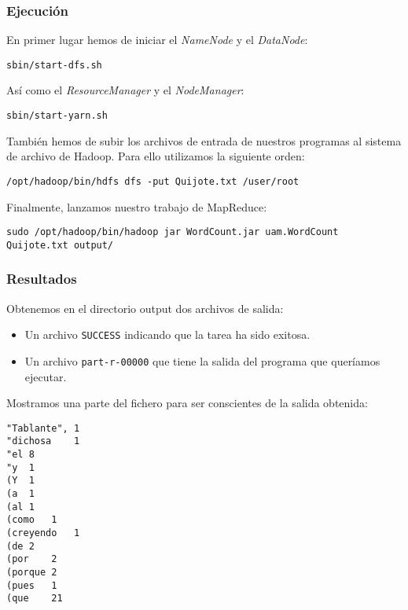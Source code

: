 \documentclass[11pt]{article}
\def\inline{\lstinline[basicstyle=\ttfamily,keywordstyle={}]}
\begin{document}
\subsubsection*{ Ejecución }

En primer lugar hemos de iniciar el \emph{NameNode} y el \emph{DataNode}:

\begin{verbatim}
sbin/start-dfs.sh
\end{verbatim}

Así como el \emph{ResourceManager} y el \emph{NodeManager}:

\begin{verbatim}
sbin/start-yarn.sh
\end{verbatim}

También hemos de subir los archivos de entrada de nuestros programas al sistema de archivo de Hadoop. Para ello utilizamos la siguiente orden:

\begin{verbatim}
/opt/hadoop/bin/hdfs dfs -put Quijote.txt /user/root
\end{verbatim}

Finalmente, lanzamos nuestro trabajo de MapReduce:

\begin{verbatim}
sudo /opt/hadoop/bin/hadoop jar WordCount.jar uam.WordCount Quijote.txt output/
\end{verbatim}

\subsubsection*{ Resultados }

Obtenemos en el directorio output dos archivos de salida:

\begin{itemize}
	\item Un archivo \inline{SUCCESS} indicando que la tarea ha sido exitosa.
	\item Un archivo \inline{part-r-00000} que tiene la salida del programa que queríamos ejecutar.
\end{itemize}

Mostramos una parte del fichero para ser conscientes de la salida obtenida:

\begin{verbatim}
"Tablante",	1
"dichosa	1
"el	8
"y	1
(Y	1
(a	1
(al	1
(como	1
(creyendo	1
(de	2
(por	2
(porque	2
(pues	1
(que	21
\end{verbatim}
\end{document}
